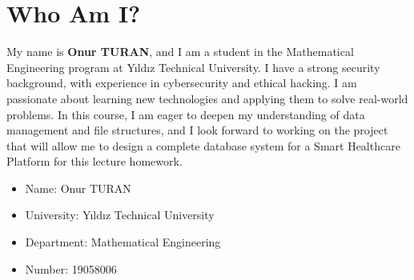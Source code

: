 \newpage
\section*{Who Am I?}

My name is \textbf{Onur TURAN}, and I am a student in the Mathematical Engineering program at Yıldız Technical University. I have a strong security background, with experience in cybersecurity and ethical hacking. I am passionate about learning new technologies and applying them to solve real-world problems. In this course, I am eager to deepen my understanding of data management and file structures, and I look forward to working on the project that will allow me to design a complete database system for a Smart Healthcare Platform for this lecture homework.

\begin{itemize}
    \item Name: Onur TURAN
    \item University: Yıldız Technical University
    \item Department: Mathematical Engineering
    \item Number: 19058006
\end{itemize}

